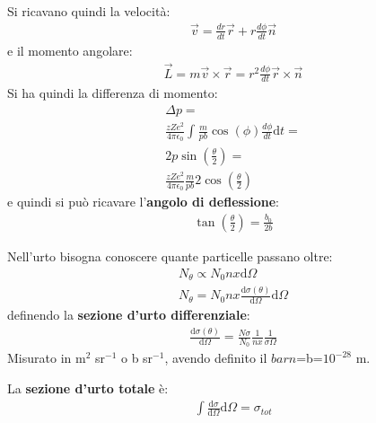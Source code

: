 \documentclass[a4paper,11pt,twoside,openany]{book}
\theoremstyle{definition}
\theoremstyle{plain}
\theoremstyle{plain}
\theoremstyle{definition}
\begin{document}
Si ricavano quindi la velocità:
\begin{equation}\begin{split}
\vec v=\frac{dr}{dt}\vec r+r\frac{d\phi }{dt}\vec n
\end{split}\end{equation}
e il momento angolare:
\begin{equation}\begin{split}
\vec L=m\vec v\times\vec r=r^2\frac{d\phi }{dt}\vec r\times \vec n
\end{split}\end{equation}
Si ha quindi la differenza di momento:
\begin{equation}\begin{split}
\Delta p=\\
\frac{zZe^2}{4\pi \epsilon _0}\int_{}^{}{\frac{m}{pb}\cos{\left(\phi \right)}\frac{d\phi }{dt} \textrm{d}t}=\\
2p\sin{\left(\frac{\theta}{2}\right)}=\\
\frac{zZe^2}{4\pi \epsilon _0}\frac{m}{pb}2\cos{\left(\frac{\theta }{2}\right)}
\end{split}\end{equation}
e quindi si può ricavare l'\textbf{angolo di deflessione}:
\begin{equation}\begin{split}
\tan{\left(\frac{\theta }{2}\right)}=\frac{b_0}{2b}
\end{split}\end{equation}

Nell'urto bisogna conoscere quante particelle passano oltre:
\begin{equation}\begin{split}
N_\theta \propto N_0nx\textrm{d}\Omega  \\
N_\theta = N_0 nx \frac{\textrm{d}\sigma\left(\theta\right)}{\textrm{d}\Omega}\textrm{d}\Omega
\end{split}\end{equation}
definendo la \textbf{sezione d'urto differenziale}:
\begin{equation}\begin{split}
\frac{\textrm{d}\sigma\left(\theta\right)}{\textrm{d}\Omega}=\frac{N\sigma}{N_0}\frac{1}{nx}\frac{1}{\sigma\Omega}
\end{split}\end{equation}
Misurato in m$^2$ sr$^{-1}$ o b sr$^{-1}$, avendo definito il $barn$=b=$10^{-28}$ m.

La \textbf{sezione d'urto totale} è:
\begin{equation}\begin{split}
\int {\frac{\textrm{d}\sigma}{\textrm{d}\Omega} \textrm{d}\Omega}=\sigma_{tot}
\end{split}\end{equation}
\end{document}
